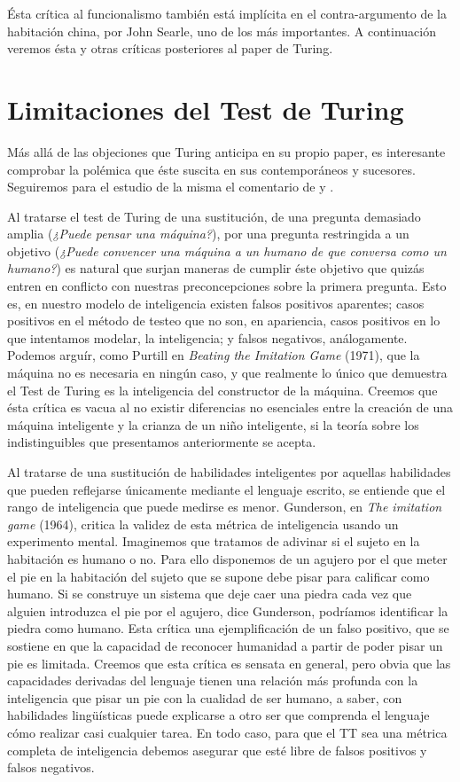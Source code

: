 \documentclass[12pt]{memoir}
\begin{document}
Ésta crítica al funcionalismo también está implícita en el contra-argumento de la habitación china, por John Searle, uno de los más importantes. A continuación veremos ésta y otras críticas posteriores al paper de Turing.

\section{Limitaciones del Test de Turing}

Más allá de las objeciones que Turing anticipa en su propio paper, es interesante comprobar la polémica que éste suscita en sus contemporáneos y sucesores. Seguiremos para el estudio de la misma el comentario de \parencite{afterTuring} y \parencite{katrina}.

Al tratarse el test de Turing de una sustitución, de una pregunta demasiado amplia (\textit{¿Puede pensar una máquina?}), por una pregunta restringida a un objetivo (\textit{¿Puede convencer una máquina a un humano de que conversa como un humano?}) es natural que surjan maneras de cumplir éste objetivo que quizás entren en conflicto con nuestras preconcepciones sobre la primera pregunta. Esto es, en nuestro modelo de inteligencia existen falsos positivos aparentes; casos positivos en el método de testeo que no son, en apariencia, casos positivos en lo que intentamos modelar, la inteligencia; y falsos negativos, análogamente. Podemos arguír, como Purtill en \textit{Beating the Imitation Game} (1971), que la máquina no es necesaria en ningún caso, y que realmente lo único que demuestra el Test de Turing es la inteligencia del constructor de la máquina. Creemos que ésta crítica es vacua al no existir diferencias no esenciales entre la creación de una máquina inteligente y la crianza de un niño inteligente, si la teoría sobre los indistinguibles que presentamos anteriormente se acepta.

Al tratarse de una sustitución de habilidades inteligentes por aquellas habilidades que pueden reflejarse únicamente mediante el lenguaje escrito, se entiende que el rango de inteligencia que puede medirse es menor. Gunderson, en \textit{The imitation game} (1964), critica la validez de esta métrica de inteligencia usando un experimento mental. Imaginemos que tratamos de adivinar si el sujeto en la habitación es humano o no. Para ello disponemos de un agujero por el que meter el pie en la habitación del sujeto que se supone debe pisar para calificar como humano. Si se construye un sistema que deje caer una piedra cada vez que alguien introduzca el pie por el agujero, dice Gunderson, podríamos identificar la piedra como humano. Esta crítica una ejemplificación de un falso positivo, que se sostiene en que la capacidad de reconocer humanidad a partir de poder pisar un pie es limitada. Creemos que esta crítica es sensata en general, pero obvia que las capacidades derivadas del lenguaje tienen una relación más profunda con la inteligencia que pisar un pie con la cualidad de ser humano, a saber, con habilidades lingüísticas puede explicarse a otro ser que comprenda el lenguaje cómo realizar casi cualquier tarea. En todo caso, para que el TT sea una métrica completa de inteligencia debemos asegurar que esté libre de falsos positivos y falsos negativos.
\end{document}
